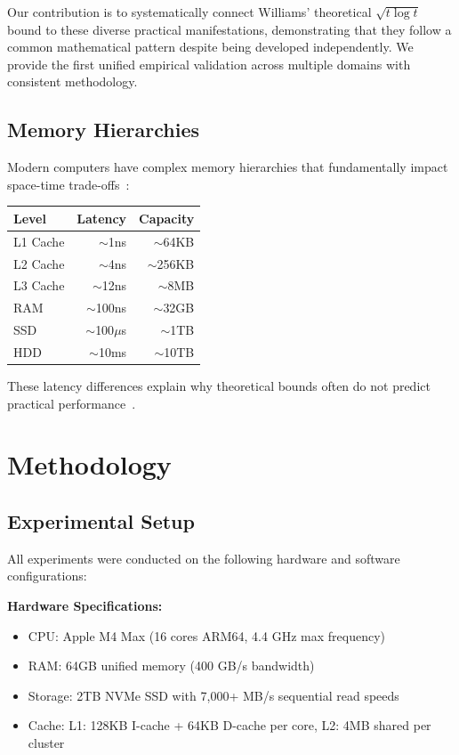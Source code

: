 \documentclass[11pt]{article}
\theoremstyle{definition}
\begin{document}
Our contribution is to systematically connect Williams' theoretical $\sqrt{t \log t}$ bound to these diverse practical manifestations, demonstrating that they follow a common mathematical pattern despite being developed independently. We provide the first unified empirical validation across multiple domains with consistent methodology.

\subsection{Memory Hierarchies}

Modern computers have complex memory hierarchies that fundamentally impact space-time trade-offs~\cite{vitter2008}:

\begin{center}
\begin{tabular}{lrr}
\toprule
Level & Latency & Capacity \\
\midrule
L1 Cache & $\sim$1ns & $\sim$64KB \\
L2 Cache & $\sim$4ns & $\sim$256KB \\
L3 Cache & $\sim$12ns & $\sim$8MB \\
RAM & $\sim$100ns & $\sim$32GB \\
SSD & $\sim$100$\mu$s & $\sim$1TB \\
HDD & $\sim$10ms & $\sim$10TB \\
\bottomrule
\end{tabular}
\end{center}

These latency differences explain why theoretical bounds often do not predict practical performance~\cite{patrascu2006}.

\section{Methodology}
\label{sec:methodology}

\subsection{Experimental Setup}

All experiments were conducted on the following hardware and software configurations:

\textbf{Hardware Specifications:}
\begin{itemize}
\item CPU: Apple M4 Max (16 cores ARM64, 4.4 GHz max frequency)
\item RAM: 64GB unified memory (400 GB/s bandwidth)
\item Storage: 2TB NVMe SSD with 7,000+ MB/s sequential read speeds
\item Cache: L1: 128KB I-cache + 64KB D-cache per core, L2: 4MB shared per cluster
\end{itemize}
\end{document}
